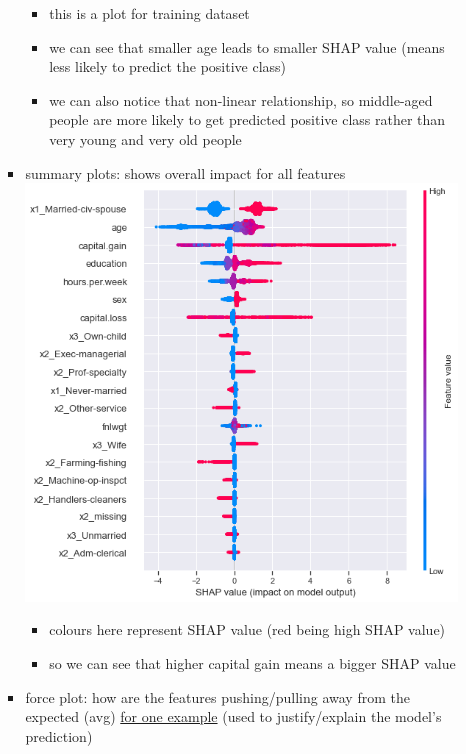 \documentclass[10.5pt,a4paper, fleqn, dvipsnames]{article}
\begin{document}
\begin{itemize}
\begin{itemize}
\begin{itemize}[leftmargin = 2em]
            \begin{itemize}[leftmargin = 2em]
                \item this is a plot for training dataset
                \item we can see that smaller age leads to smaller SHAP value (means less likely to predict the positive class)
                \item we can also notice that non-linear relationship, so middle-aged people are more likely to get predicted positive class rather than very young and very old people 
            \end{itemize}
            \item summary plots: shows overall impact for all features\\
            \includegraphics[scale = 0.6]{shap-summary-plots.png}
            \begin{itemize}
                \item colours here represent SHAP value (red being high SHAP value)
                \item so we can see that higher capital gain means a bigger SHAP value 
            \end{itemize}
            \item force plot: how are the features pushing/pulling away from the expected (avg) \ul{for one example} (used to justify/explain the model's prediction)\\

\end{itemize}
\end{itemize}
\end{itemize}
\end{document}
